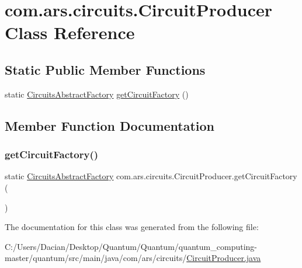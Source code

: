 \hypertarget{classcom_1_1ars_1_1circuits_1_1_circuit_producer}{}\section{com.\+ars.\+circuits.\+Circuit\+Producer Class Reference}
\label{classcom_1_1ars_1_1circuits_1_1_circuit_producer}
\subsection*{Static Public Member Functions}
\begin{DoxyCompactItemize}
\item 
static \hyperlink{classcom_1_1ars_1_1circuits_1_1_circuits_abstract_factory}{Circuits\+Abstract\+Factory} \hyperlink{classcom_1_1ars_1_1circuits_1_1_circuit_producer_a309e58fbb248b354abc746f9a82233eb}{get\+Circuit\+Factory} ()
\end{DoxyCompactItemize}


\subsection{Member Function Documentation}
\hypertarget{classcom_1_1ars_1_1circuits_1_1_circuit_producer_a309e58fbb248b354abc746f9a82233eb}{}\label{classcom_1_1ars_1_1circuits_1_1_circuit_producer_a309e58fbb248b354abc746f9a82233eb} 
\subsubsection{\texorpdfstring{get\+Circuit\+Factory()}{getCircuitFactory()}}
{\footnotesize\ttfamily static \hyperlink{classcom_1_1ars_1_1circuits_1_1_circuits_abstract_factory}{Circuits\+Abstract\+Factory} com.\+ars.\+circuits.\+Circuit\+Producer.\+get\+Circuit\+Factory (\begin{DoxyParamCaption}{ }\end{DoxyParamCaption})\hspace{0.3cm}{\ttfamily [static]}}



The documentation for this class was generated from the following file\+:\begin{DoxyCompactItemize}
\item 
C\+:/\+Users/\+Dacian/\+Desktop/\+Quantum/\+Quantum/quantum\+\_\+computing-\/master/quantum/src/main/java/com/ars/circuits/\hyperlink{_circuit_producer_8java}{Circuit\+Producer.\+java}\end{DoxyCompactItemize}
